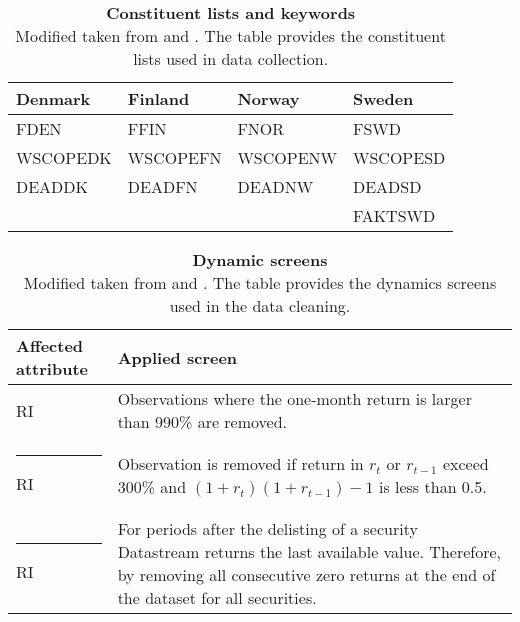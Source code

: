 \documentclass[12pt]{article}
\begin{document}
\begin{table}[H] 
\footnotesize
\caption[Constituent lists and keywords]{\textbf{Constituent lists and keywords}\\ Modified taken from \protect\citet{Ince2006} and \protect\citet{HANAUER2023106712}. The table provides the constituent lists used in data collection.}
 \label{table:constituteLists}
\centering
\begin{tabularx}{\textwidth}{X X X X}
\toprule
Denmark & Finland & Norway & Sweden \\
\midrule
FDEN 		&  FFIN		& FNOR		& FSWD\\
WSCOPEDK & WSCOPEFN & WSCOPENW& WSCOPESD\\
DEADDK 	&   DEADFN 	& DEADNW 	& DEADSD\\
& & & FAKTSWD\\
 \bottomrule
 \end{tabularx}
 \end{table} 
 
\begin{table}[H] 
\footnotesize
\caption[Dynamic screens]{\textbf{Dynamic screens}\\ Modified taken from \protect\citet{Ince2006} and \protect\citet{HANAUER2023106712}. The table provides the dynamics screens used in the data cleaning.}
 \label{table:DynamicScreens}
\centering
\begin{tabularx}{\textwidth}{l X}
\toprule
Affected attribute & Applied screen \\
\midrule
RI 		& Observations where the one-month return is larger than 990\% are removed.\\ \rule{-1ex}{3ex}
RI		& Observation is removed if return in $r_t$ or $r_{t-1}$ exceed 300\% and $(1+r_{t})(1+r_{t-1}) -1$ is less than 0.5. \\ \rule{-1ex}{3ex}
RI 		& For periods after the delisting of a security Datastream returns the last available value. Therefore, by removing all consecutive zero returns at the end of the dataset for all securities.\\
 \bottomrule
 \end{tabularx}
 \end{table} 
\end{document}
